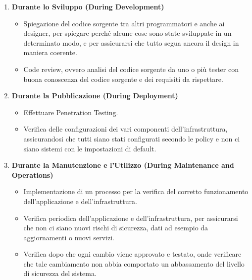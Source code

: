 \documentclass{article}
\begin{document}
\begin{enumerate}
    \item \textbf{Durante lo Sviluppo (During Development)}
    \begin{itemize}
        \item Spiegazione del codice sorgente tra altri programmatori e anche ai designer, per spiegare perché alcune cose sono state sviluppate in un determinato modo, e per assicurarsi che tutto segua ancora il design in maniera coerente.

        \item Code review, ovvero analisi del codice sorgente da uno o più tester con buona conoscenza del codice sorgente e dei requisiti da rispettare.
    \end{itemize}

    \newpage
    \item \textbf{Durante la Pubblicazione (During Deployment)}
    \begin{itemize}
        \item Effettuare Penetration Testing.

        \item Verifica delle configurazioni dei vari componenti dell’infrastruttura, assicurandosi che tutti siano stati configurati secondo le policy e non ci siano sistemi con le impostazioni di default.
    \end{itemize}

    \item \textbf{Durante la Manutenzione e l’Utilizzo (During Maintenance and Operations)}
    \begin{itemize}
        \item Implementazione di un processo per la verifica del corretto funzionamento dell’applicazione e dell’infrastruttura.

        \item Verifica periodica dell’applicazione e dell’infrastruttura, per assicurarsi che non ci siano nuovi rischi di sicurezza, dati ad esempio da aggiornamenti o nuovi servizi.

        \item  Verifica dopo che ogni cambio viene approvato e testato, onde verificare che tale cambiamento non abbia comportato un abbassamento del livello di sicurezza del sistema.
    \end{itemize}
\end{enumerate}
\end{document}
